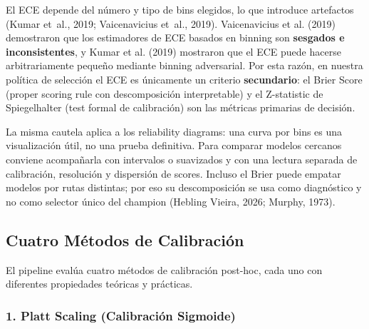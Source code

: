 \documentclass[
  spanish,
  11pt,
  letterpaper,
]{scrbook}
\theoremstyle{plain}
\theoremstyle{remark}
\begin{document}
\begin{tcolorbox}[enhanced jigsaw, arc=.35mm, bottomrule=.15mm, bottomtitle=1mm, breakable, colback=white, colbacktitle=quarto-callout-warning-color!10!white, colframe=quarto-callout-warning-color-frame, coltitle=black, left=2mm, leftrule=.75mm, opacityback=0, opacitybacktitle=0.6, rightrule=.15mm, title=\textcolor{quarto-callout-warning-color}{\faExclamationTriangle}\hspace{0.5em}{Limitaciones del ECE como métrica de calibración}, titlerule=0mm, toprule=.15mm, toptitle=1mm]

El ECE depende del número y tipo de bins elegidos, lo que introduce
artefactos (Kumar et~al., 2019; Vaicenavicius et~al., 2019).
Vaicenavicius et al. (2019) demostraron que los estimadores de ECE
basados en binning son \textbf{sesgados e inconsistentes}, y Kumar et
al. (2019) mostraron que el ECE puede hacerse arbitrariamente pequeño
mediante binning adversarial. Por esta razón, en nuestra política de
selección el ECE es únicamente un criterio \textbf{secundario}: el Brier
Score (proper scoring rule con descomposición interpretable) y el
Z-statistic de Spiegelhalter (test formal de calibración) son las
métricas primarias de decisión.

La misma cautela aplica a los reliability diagrams: una curva por bins
es una visualización útil, no una prueba definitiva. Para comparar
modelos cercanos conviene acompañarla con intervalos o suavizados y con
una lectura separada de calibración, resolución y dispersión de scores.
Incluso el Brier puede empatar modelos por rutas distintas; por eso su
descomposición se usa como diagnóstico y no como selector único del
champion (Hebling Vieira, 2026; Murphy, 1973).

\end{tcolorbox}

\subsection{Cuatro Métodos de
Calibración}\label{sec-calibration-methods}

El pipeline evalúa cuatro métodos de calibración post-hoc, cada uno con
diferentes propiedades teóricas y prácticas.

\subsubsection{1. Platt Scaling (Calibración
Sigmoide)}\label{platt-scaling-calibraciuxf3n-sigmoide}
\end{document}
